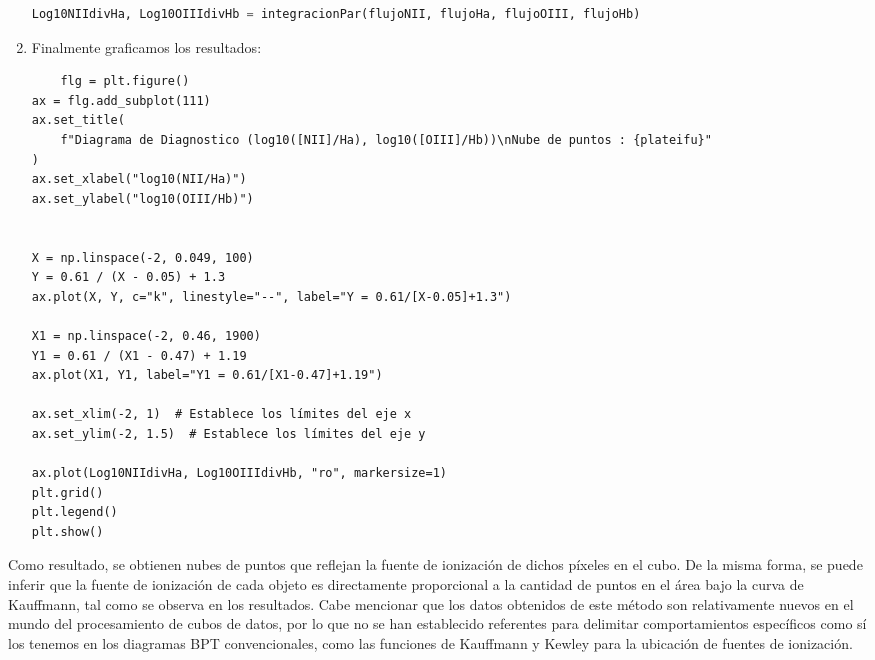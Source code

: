 \documentclass[10pt,twocolumn,a4paper]{opticajnl}
\begin{document}
\begin{enumerate}
\begin{lstlisting}[language=Python]
Log10NIIdivHa, Log10OIIIdivHb = integracionPar(flujoNII, flujoHa, flujoOIII, flujoHb)
  \end{lstlisting}
  \item Finalmente graficamos los resultados:
  \begin{lstlisting}
    flg = plt.figure()
ax = flg.add_subplot(111)
ax.set_title(
    f"Diagrama de Diagnostico (log10([NII]/Ha), log10([OIII]/Hb))\nNube de puntos : {plateifu}"
)
ax.set_xlabel("log10(NII/Ha)")
ax.set_ylabel("log10(OIII/Hb)")


X = np.linspace(-2, 0.049, 100)
Y = 0.61 / (X - 0.05) + 1.3
ax.plot(X, Y, c="k", linestyle="--", label="Y = 0.61/[X-0.05]+1.3")

X1 = np.linspace(-2, 0.46, 1900)
Y1 = 0.61 / (X1 - 0.47) + 1.19
ax.plot(X1, Y1, label="Y1 = 0.61/[X1-0.47]+1.19")

ax.set_xlim(-2, 1)  # Establece los límites del eje x
ax.set_ylim(-2, 1.5)  # Establece los límites del eje y

ax.plot(Log10NIIdivHa, Log10OIIIdivHb, "ro", markersize=1)
plt.grid()
plt.legend()
plt.show()
  \end{lstlisting} 
\end{enumerate}

Como resultado, se obtienen nubes de puntos que reflejan la fuente de ionización de dichos píxeles en el cubo. De la misma forma, se puede inferir que la fuente de ionización de cada objeto es directamente proporcional a la cantidad de puntos en el área bajo la curva de Kauffmann, tal como se observa en los resultados. Cabe mencionar que los datos obtenidos de este método son relativamente nuevos en el mundo del procesamiento de cubos de datos, por lo que no se han establecido referentes para delimitar comportamientos específicos como sí los tenemos en los diagramas BPT convencionales, como las funciones de Kauffmann y Kewley para la ubicación de fuentes de ionización.
\end{document}
